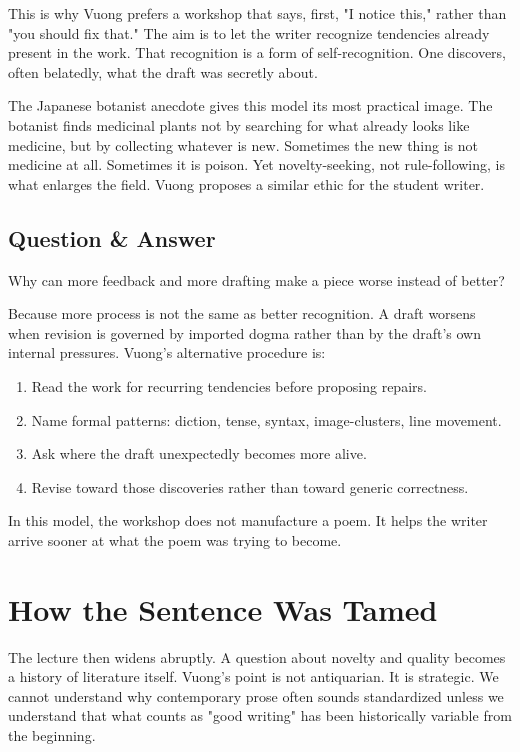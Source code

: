 This is why Vuong prefers a workshop that says, first, "I notice this," rather than "you should fix that." The aim is to let the writer recognize tendencies already present in the work. That recognition is a form of self-recognition. One discovers, often belatedly, what the draft was secretly about.

The Japanese botanist anecdote gives this model its most practical image. The botanist finds medicinal plants not by searching for what already looks like medicine, but by collecting whatever is new. Sometimes the new thing is not medicine at all. Sometimes it is poison. Yet novelty-seeking, not rule-following, is what enlarges the field. Vuong proposes a similar ethic for the student writer.

\subsection{Question \& Answer}

Why can more feedback and more drafting make a piece worse instead of better?

Because more process is not the same as better recognition. A draft worsens when revision is governed by imported dogma rather than by the draft's own internal pressures. Vuong's alternative procedure is:
\begin{enumerate}
\item Read the work for recurring tendencies before proposing repairs.
\item Name formal patterns: diction, tense, syntax, image-clusters, line movement.
\item Ask where the draft unexpectedly becomes more alive.
\item Revise toward those discoveries rather than toward generic correctness.
\end{enumerate}
In this model, the workshop does not manufacture a poem. It helps the writer arrive sooner at what the poem was trying to become.

\section{How the Sentence Was Tamed}

The lecture then widens abruptly. A question about novelty and quality becomes a history of literature itself. Vuong's point is not antiquarian. It is strategic. We cannot understand why contemporary prose often sounds standardized unless we understand that what counts as "good writing" has been historically variable from the beginning.

